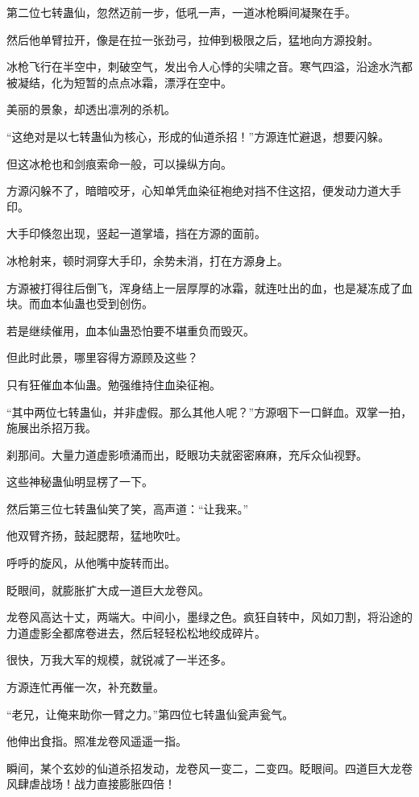\begin{this_body}
第二位七转蛊仙，忽然迈前一步，低吼一声，一道冰枪瞬间凝聚在手。

然后他单臂拉开，像是在拉一张劲弓，拉伸到极限之后，猛地向方源投射。

冰枪飞行在半空中，刺破空气，发出令人心悸的尖啸之音。寒气四溢，沿途水汽都被凝结，化为短暂的点点冰霜，漂浮在空中。

美丽的景象，却透出凛冽的杀机。

“这绝对是以七转蛊仙为核心，形成的仙道杀招！”方源连忙避退，想要闪躲。

但这冰枪也和剑痕索命一般，可以操纵方向。

方源闪躲不了，暗暗咬牙，心知单凭血染征袍绝对挡不住这招，便发动力道大手印。

大手印倏忽出现，竖起一道掌墙，挡在方源的面前。

冰枪射来，顿时洞穿大手印，余势未消，打在方源身上。

方源被打得往后倒飞，浑身结上一层厚厚的冰霜，就连吐出的血，也是凝冻成了血块。而血本仙蛊也受到创伤。

若是继续催用，血本仙蛊恐怕要不堪重负而毁灭。

但此时此景，哪里容得方源顾及这些？

只有狂催血本仙蛊。勉强维持住血染征袍。

“其中两位七转蛊仙，并非虚假。那么其他人呢？”方源咽下一口鲜血。双掌一拍，施展出杀招万我。

刹那间。大量力道虚影喷涌而出，眨眼功夫就密密麻麻，充斥众仙视野。

这些神秘蛊仙明显楞了一下。

然后第三位七转蛊仙笑了笑，高声道：“让我来。”

他双臂齐扬，鼓起腮帮，猛地吹吐。

呼呼的旋风，从他嘴中旋转而出。

眨眼间，就膨胀扩大成一道巨大龙卷风。

龙卷风高达十丈，两端大。中间小，墨绿之色。疯狂自转中，风如刀割，将沿途的力道虚影全都席卷进去，然后轻轻松松地绞成碎片。

很快，万我大军的规模，就锐减了一半还多。

方源连忙再催一次，补充数量。

“老兄，让俺来助你一臂之力。”第四位七转蛊仙瓮声瓮气。

他伸出食指。照准龙卷风遥遥一指。

瞬间，某个玄妙的仙道杀招发动，龙卷风一变二，二变四。眨眼间。四道巨大龙卷风肆虐战场！战力直接膨胀四倍！


\end{this_body}
